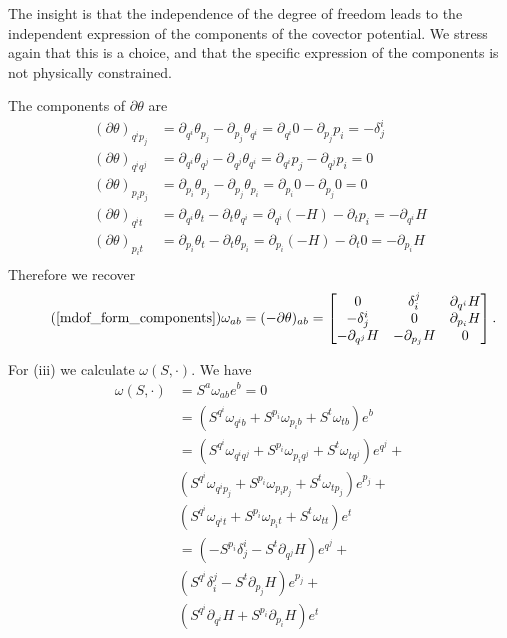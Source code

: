 \documentclass[10pt,twocolumn, nofootinbib]{revtex4-2}
\begin{document}
The insight is that the independence of the degree of freedom leads to the independent expression of the components of the covector potential. We stress again that this is a choice, and that the specific expression of the components is not physically constrained.

The components of $\partial\theta$ are
\begin{equation}
	\begin{aligned}
		(\partial\theta)_{q^i p_j} &= \partial_{q^i}\theta_{p_j} - \partial_{p_j}\theta_{q^i} = \partial_{q^i} 0 - \partial_{p_j} p_i= - \delta^i_j \\
		(\partial\theta)_{q^i q^j} &= \partial_{q^i}\theta_{q^j} - \partial_{q^j}\theta_{q^i} = \partial_{q^i}p_j - \partial_{q^j}p_i = 0 \\
		(\partial\theta)_{p_i p_j} &= \partial_{p_i}\theta_{p_j} - \partial_{p_j}\theta_{p_i} = \partial_{p_i} 0 - \partial_{p_j} 0 = 0 \\
		(\partial\theta)_{q^i t} &= \partial_{q^i}\theta_{t} - \partial_{t}\theta_{q^i} = \partial_{q^i} (-H) - \partial_{t} p_i= - \partial_{q^i} H \\
		(\partial\theta)_{p_i t} &= \partial_{p_i}\theta_{t} - \partial_{t}\theta_{p_i} = \partial_{p_i} (-H) - \partial_{t} 0= - \partial_{p_i} H \\
	\end{aligned}
\end{equation}
Therefore we recover
\begin{equation}
	\tag*{(\ref{mdof_form_components})}
	\omega_{ab}=(-\partial\theta)_{ab} = \begin{bmatrix}
		0 & \delta^j_i & \partial_{q^i} H \\
		-\delta^i_j & 0 & \partial_{p_i} H \\
		- \partial_{q^j} H & - \partial_{p_j} H & 0
	\end{bmatrix}.
\end{equation}

For (iii) we calculate $\omega(S, \cdot ) $. We have
\begin{equation}
\begin{aligned}
	\omega(S, \cdot )  &= S^a \omega_{ab} e^b = 0 \\
	&= (S^{q^i}\omega_{q^ib} + S^{p_i}\omega_{p_ib} + S^{t}\omega_{tb}) e^b \\
	&= (S^{q^i}\omega_{q^iq^j} + S^{p_i}\omega_{p_iq^j} + S^{t}\omega_{tq^j}) e^{q^j} + \\
	& (S^{q^i}\omega_{q^ip_j} +  S^{p_i}\omega_{p_ip_j} + S^{t}\omega_{tp_j}) e^{p_j} + \\
	& (S^{q^i}\omega_{q^it} + S^{p_i}\omega_{p_it} + S^{t}\omega_{tt}) e^t \\
	&= (-S^{p_i}\delta^i_j - S^{t}\partial_{q^j} H ) e^{q^j} + \\
	& (S^{q^i}\delta^j_i -  S^{t}\partial_{p_j} H) e^{p_j} + \\
	& (S^{q^i} \partial_{q^i} H + S^{p_i} \partial_{p_i} H) e^t \\
\end{aligned}
\end{equation}
\end{document}

